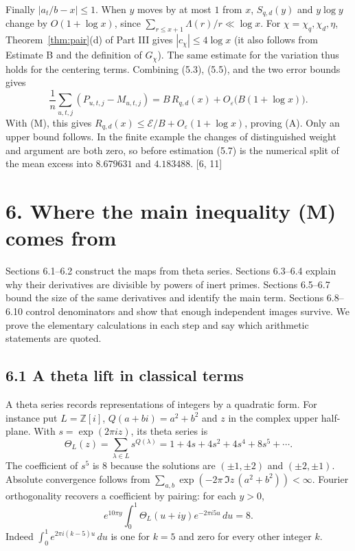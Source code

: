 \documentclass[11pt,letterpaper]{article}
\begin{document}
{Finally $|a_t/b-x|\le1$. When $y$ moves by at most $1$ from $x$, $S_{q,d}(y)$ and $y\log y$ change by $O(1+\log x)$, since $\sum_{r\le x+1}\Lambda(r)/r\ll\log x$. For $\chi=\chi_q,\chi_d,\eta$, Theorem~\ref{thm:pair}(d) of Part III gives $|c_\chi|\le4\log x$ (it also follows from Estimate B and the definition of $G_\chi$). The same estimate for the variation thus holds for the centering terms. Combining (5.3), (5.5), and the two error bounds gives
\begin{equation}\label{D:75}
 \frac1n\sum_{u,t,j}(P_{u,t,j}-M_{u,t,j})
       =B\,R_{q,d}(x)+O_\varepsilon\big(B(1+\log x)\big).        \tag{5.7}
\end{equation}
With (M), this gives $R_{q,d}(x)\le\mathcal E/B+O_\varepsilon(1+\log x)$, proving (A). Only an upper bound follows. In the finite example the changes of distinguished weight and argument are both zero, so before estimation (5.7) is the numerical split of the mean excess into $8.679631$ and $4.183488$. [6, 11]

\newpage
\section*{6. Where the main inequality (M) comes from}

Sections 6.1--6.2 construct the maps from theta series. Sections 6.3--6.4 explain why their derivatives are divisible by powers of inert primes. Sections 6.5--6.7 bound the size of the same derivatives and identify the main term. Sections 6.8--6.10 control denominators and show that enough independent images survive. We prove the elementary calculations in each step and say which arithmetic statements are quoted.

\subsection*{6.1 A theta lift in classical terms}

A theta series records representations of integers by a quadratic form. For instance put $L=\mathbb Z[i]$, $Q(a+bi)=a^2+b^2$ and $z$ in the complex upper half-plane. With $s=\exp(2\pi i z)$, its theta series is
\begin{equation}\label{D:76}
 \Theta_L(z)=\sum_{\lambda\in L}s^{Q(\lambda)}
     =1+4s+4s^2+4s^4+8s^5+\cdots .
\end{equation}
The coefficient of $s^5$ is $8$ because the solutions are $(\pm1,\pm2)$ and $(\pm2,\pm1)$. Absolute convergence follows from $\sum_{a,b}\exp(-2\pi\,\Im z\,(a^2+b^2))<\infty$. Fourier orthogonality recovers a coefficient by pairing: for each $y>0$,
\begin{equation}\label{D:77}
 e^{10\pi y}\int_0^1 \Theta_L(u+iy)e^{-2\pi i5u}\,du=8.
\end{equation}
Indeed $\int_0^1 e^{2\pi i(k-5)u}\,du$ is one for $k=5$ and zero for every other integer $k$.

}
\end{document}
